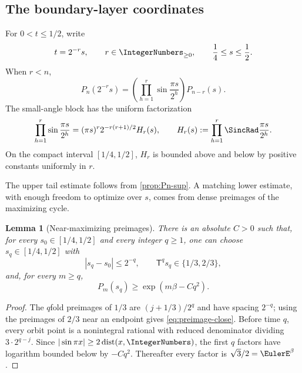 \documentclass[11pt,oneside]{article}
\newtheorem{lemma}[theorem]{Lemma}
\theoremstyle{definition}
\theoremstyle{remark}
\newcommand{\T}{\mathsf T}
\begin{document}
\subsection{The boundary-layer coordinates}

For $0<t\le1/2$, write
\begin{equation}
 t=2^{-r}s,
 \qquad r\in\IntegerNumbers_{\ge0},
 \qquad \frac14\le s\le\frac12.
 \label{eq:transition-coordinates}
\end{equation}
When $r<n$,
\begin{equation}
 P_n(2^{-r}s)
 =\left(\prod_{h=1}^{r}\sin\frac{\pi s}{2^h}\right)P_{n-r}(s).
 \label{eq:P-transition}
\end{equation}
The small-angle block has the uniform factorization
\begin{equation}
 \prod_{h=1}^{r}\sin\frac{\pi s}{2^h}
 =(\pi s)^r2^{-r(r+1)/2}H_r(s),
 \qquad
 H_r(s):=\prod_{h=1}^{r}\SincRad\frac{\pi s}{2^h}.
 \label{eq:small-block}
\end{equation}
On the compact interval $[1/4,1/2]$, $H_r$ is bounded above and below by
positive constants uniformly in $r$.

The upper tail estimate follows from \cref{prop:Pn-sup}.  A matching lower
estimate, with enough freedom to optimize over $s$, comes from dense preimages
of the maximizing cycle.

\begin{lemma}[Near-maximizing preimages]
\label{lem:preimages}
There is an absolute $C>0$ such that, for every $s_0\in[1/4,1/2]$ and every
integer $q\ge1$, one can choose $s_q\in[1/4,1/2]$ with
\begin{equation}
 |s_q-s_0|\le2^{-q},
 \qquad
 \T^qs_q\in\{1/3,2/3\},
 \label{eq:preimage-close}
\end{equation}
and, for every $m\ge q$,
\begin{equation}
 P_m(s_q)\ge\exp(m\beta-Cq^2).
 \label{eq:preimage-lower}
\end{equation}
\end{lemma}

\begin{proof}
The $q$fold preimages of $1/3$ are
$(j+1/3)/2^q$ and have spacing $2^{-q}$; using the preimages of $2/3$ near an
endpoint gives \eqref{eq:preimage-close}.  Before time $q$, every orbit point
is a nonintegral rational with reduced denominator dividing
$3\cdot2^{q-j}$.  Since
$|\sin\pi x|\ge2\operatorname{dist}(x,\IntegerNumbers)$, the first $q$ factors have
logarithm bounded below by $-Cq^2$.  Thereafter every factor is
$\sqrt3/2=\EulerE^\beta$.
\end{proof}
\end{document}
